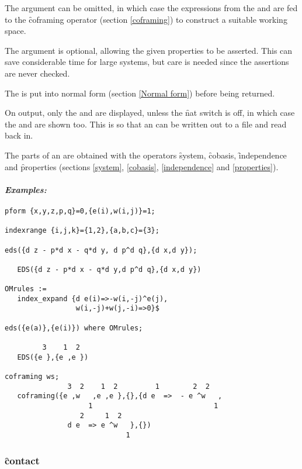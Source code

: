 The  argument can be omitted, in which case the expressions
from the  and  are fed to the
\f{coframing} operator (section \ref{coframing}) to construct a suitable
working space.

The  argument is optional, allowing the given properties
to be asserted. This can save considerable time for large systems, but care
is needed since the assertions are never checked.

The  is put into normal form (section \ref{Normal form}) before
being returned.

On output, only the  and  are
displayed, unless the \f{nat} switch is off, in which case the
 and  are shown too. This is so that an
 can be written out to a file and read back in.

The parts of an  are obtained with the operators \f{system},
\f{cobasis}, \f{independence} and \f{properties} (sections \ref{system},
\ref{cobasis}, \ref{independence} and \ref{properties}).

\paragraph{\textit{Examples:}}
\begin{verbatim}
pform {x,y,z,p,q}=0,{e(i),w(i,j)}=1;

indexrange {i,j,k}={1,2},{a,b,c}={3};

eds({d z - p*d x - q*d y, d p^d q},{d x,d y});

   EDS({d z - p*d x - q*d y,d p^d q},{d x,d y})

OMrules :=
   index_expand {d e(i)=>-w(i,-j)^e(j),
                 w(i,-j)+w(j,-i)=>0}$

eds({e(a)},{e(i)}) where OMrules;

         3    1  2
   EDS({e },{e ,e })

coframing ws;
               3  2    1  2         1        2  2
   coframing({e ,w   ,e ,e },{},{d e  =>  - e ^w   ,
                    1                             1
                  2     1  2
               d e  => e ^w   },{})
                             1
\end{verbatim}

\subsubsection{\f{contact}}
\label{contact}

